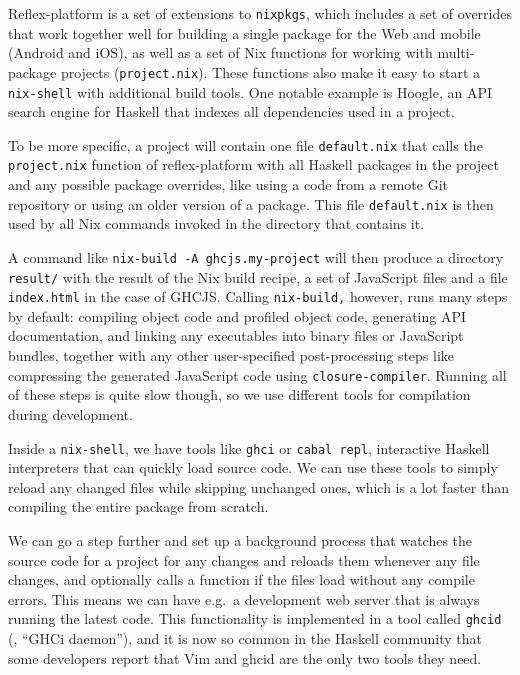 \documentclass[english,odsaz]{fitthesis}
\begin{document}
Reflex-platform is a set of extensions to \texttt{nixpkgs}, which includes a set of
overrides that work together well for building a single package for the Web and
mobile (Android and iOS), as well as a set of Nix functions for working with
multi-package projects (\texttt{project.nix}). These functions also make it easy to start
a \texttt{nix-shell} with additional build tools. One notable example is Hoogle, an API
search engine for Haskell that indexes all dependencies used in a project.

To be more specific, a project will contain one file \texttt{default.nix} that calls the
\texttt{project.nix} function of reflex-platform with all Haskell packages in the project
and any possible package overrides, like using a code from a remote Git
repository or using an older version of a package. This file \texttt{default.nix} is then
used by all Nix commands invoked in the directory that contains it.

A command like \texttt{nix-build -A ghcjs.my-project} will then produce a directory
\texttt{result/} with the result of the Nix build recipe, a set of JavaScript files and a
file \texttt{index.html} in the case of GHCJS. Calling \texttt{nix-build,} however, runs many steps
by default: compiling object code and profiled object code, generating API
documentation, and linking any executables into binary files or JavaScript
bundles, together with any other user-specified post-processing steps like
compressing the generated JavaScript code using \texttt{closure-compiler}. Running all of
these steps is quite slow though, so we use different tools for compilation
during development.

Inside a \texttt{nix-shell}, we have tools like \texttt{ghci} or \texttt{cabal repl}, interactive Haskell
interpreters that can quickly load source code. We can use these tools to simply
reload any changed files while skipping unchanged ones, which is a lot faster
than compiling the entire package from scratch.

We can go a step further and set up a background process that watches the source
code for a project for any changes and reloads them whenever any file changes,
and optionally calls a function if the files load without any compile
errors. This means we can have e.g.~a development web server that is always
running the latest code. This functionality is implemented in a tool called
\texttt{ghcid} (\cite{ghcid}, ``GHCi daemon''), and it is now so common in the Haskell
community that some developers report that Vim and ghcid are the only two tools
they need.
\end{document}
